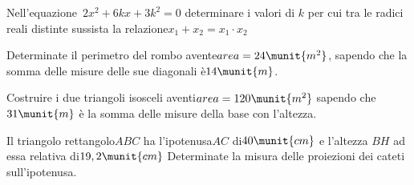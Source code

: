 \begin{esercizio}
\label{ese:3.80}
Nell'equazione~\(2 x^{2} + 6 k x + 3 k^{2} = 0\) 
determinare i valori di \(k\) per cui tra le radici reali distinte sussista 
la relazione\(x_{1} + x_{2} = x_{1} \cdot x_{2}\)
\end{esercizio}

\begin{esercizio}
\label{ese:3.81}
Determinate il perimetro del rombo avente\(area = 24\munit{m^{2}}\), 
sapendo che la somma delle misure delle sue diagonali è\(14\munit{m}\).
\end{esercizio}

\begin{esercizio}
\label{ese:3.82}
Costruire i due triangoli isosceli aventi\(area = 120\munit{m^{2}}\) sapendo 
che \(31\munit{m}\) è la somma delle misure della base con l'altezza.
\end{esercizio}

\begin{esercizio}
\label{ese:3.83}
Il triangolo rettangolo\(ABC\) ha l'ipotenusa\(AC\) di\(40\munit{cm}\) e 
l'altezza 
\(BH\) ad essa relativa di\(19,2\munit{cm}~\)Determinate la misura delle 
proiezioni 
dei cateti sull'ipotenusa.
\end{esercizio}

\subsection*{}

